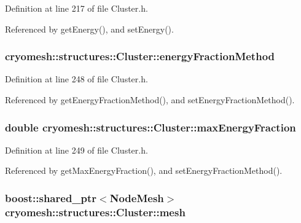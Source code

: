 \-Definition at line 217 of file \-Cluster.\-h.



\-Referenced by get\-Energy(), and set\-Energy().

\hypertarget{classcryomesh_1_1structures_1_1Cluster_a9faa149cba43092142147d8deaf0826c}{
\subsubsection[{energy\-Fraction\-Method}]{ {\bf cryomesh\-::structures\-::\-Cluster\-::energy\-Fraction\-Method}}}\label{classcryomesh_1_1structures_1_1Cluster_a9faa149cba43092142147d8deaf0826c}


\-Definition at line 248 of file \-Cluster.\-h.



\-Referenced by get\-Energy\-Fraction\-Method(), and set\-Energy\-Fraction\-Method().

\hypertarget{classcryomesh_1_1structures_1_1Cluster_aff9209e98a7a6aedad83dacaaf1b83a6}{
\subsubsection[{max\-Energy\-Fraction}]{\setlength{\rightskip}{0pt plus 5cm}double {\bf cryomesh\-::structures\-::\-Cluster\-::max\-Energy\-Fraction}}}\label{classcryomesh_1_1structures_1_1Cluster_aff9209e98a7a6aedad83dacaaf1b83a6}


\-Definition at line 249 of file \-Cluster.\-h.



\-Referenced by get\-Max\-Energy\-Fraction(), and set\-Energy\-Fraction\-Method().

\hypertarget{classcryomesh_1_1structures_1_1Cluster_a3f1688d1e47d783356c4d4705bd3f0b7}{
\subsubsection[{mesh}]{\setlength{\rightskip}{0pt plus 5cm}boost\-::shared\-\_\-ptr$<${\bf \-Node\-Mesh}$>$ {\bf cryomesh\-::structures\-::\-Cluster\-::mesh}}}\label{classcryomesh_1_1structures_1_1Cluster_a3f1688d1e47d783356c4d4705bd3f0b7}


